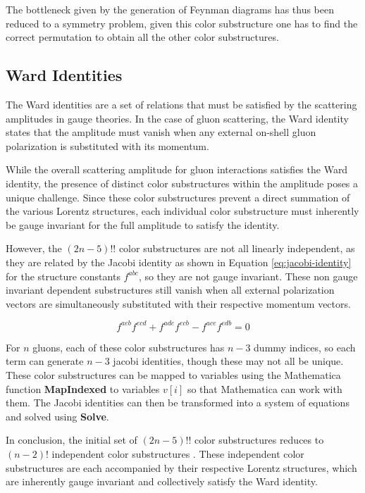 \documentclass[main.tex]{subfiles}
\begin{document}
The bottleneck given by the generation of Feynman diagrams has thus been reduced to a symmetry problem, given this color substructure one has 
to find the correct permutation to obtain all the other color substructures. 

\subsection{Ward Identities}
The Ward identities are a set of relations that must be satisfied by the scattering amplitudes in gauge theories.
In the case of gluon scattering, the Ward identity states that the amplitude must vanish when any external on-shell gluon polarization is substituted
with its momentum.

While the overall scattering amplitude for gluon interactions satisfies the Ward identity, the presence of distinct color substructures 
within the amplitude poses a unique challenge. Since these color substructures prevent a direct summation of the various 
Lorentz structures, each individual color substructure must inherently be gauge invariant for the full amplitude to satisfy the identity.

However, the $(2n-5)!!$ color substructures are not all linearly independent, as they are related by the Jacobi identity as shown in Equation \cref{eq:jacobi-identity} for the structure constants $f^{abc}$, so 
they are not gauge invariant. These non gauge invariant dependent substructures still vanish when all external polarization vectors are simultaneously substituted with their respective momentum vectors.

\begin{equation} \label{eq:jacobi-identity}
    f^{aeb}f^{ecd} + f^{ade}f^{ecb} - f^{ace}f^{edb} = 0
\end{equation}

For $n$ gluons, each of these color substructures has $n-3$ dummy indices, so each term can generate $n-3$ jacobi identities, though these may not all be unique.
These color substructures can be mapped to variables using the Mathematica function \textbf{MapIndexed} to variables $v[i]$ so that Mathematica can work with them.
The Jacobi identities can then be transformed into a system of equations and solved using \textbf{Solve}.

In conclusion, the initial set of $(2n-5)!!$ color substructures reduces to $(n-2)!$ independent color substructures \cite{DELDUCA200051}.
These independent color substructures are each accompanied by their respective Lorentz structures, which are inherently gauge invariant and collectively satisfy the Ward identity.
\end{document}
